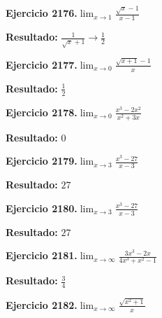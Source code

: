 \documentclass[10pt,a4paper]{article}
\begin{document}
\begin{ejbox}
\textbf{Ejercicio 2176.}\quad $\lim_{x\to 1} \frac{\sqrt{x}-1}{x-1}$
\end{ejbox}

\begin{solbox}
\textbf{Resultado:} \(\displaystyle \frac{1}{\sqrt{x}+1} \to \frac{1}{2}\)
\end{solbox}

\newpage
\begin{ejbox}
\textbf{Ejercicio 2177.}\quad $\lim_{x\to 0} \frac{\sqrt{x+1}-1}{x}$
\end{ejbox}

\begin{solbox}
\textbf{Resultado:} \(\displaystyle \frac{1}{2}\)
\end{solbox}

\begin{ejbox}
\textbf{Ejercicio 2178.}\quad $\lim_{x\to 0} \frac{x^3-2x^2}{x^2+3x}$
\end{ejbox}

\begin{solbox}
\textbf{Resultado:} \(\displaystyle 0\)
\end{solbox}

\begin{ejbox}
\textbf{Ejercicio 2179.}\quad $\lim_{x\to 3} \frac{x^3-27}{x-3}$
\end{ejbox}

\begin{solbox}
\textbf{Resultado:} \(\displaystyle 27\)
\end{solbox}

\newpage
\begin{ejbox}
\textbf{Ejercicio 2180.}\quad $\lim_{x\to 3} \frac{x^3-27}{x-3}$
\end{ejbox}

\begin{solbox}
\textbf{Resultado:} \(\displaystyle 27\)
\end{solbox}

\begin{ejbox}
\textbf{Ejercicio 2181.}\quad $\lim_{x\to \infty} \frac{3x^3 - 2x}{4x^3 + x^2 - 1}$
\end{ejbox}

\begin{solbox}
\textbf{Resultado:} \(\displaystyle \frac{3}{4}\)
\end{solbox}

\begin{ejbox}
\textbf{Ejercicio 2182.}\quad $\lim_{x\to \infty} \frac{\sqrt{x^2+1}}{x}$
\end{ejbox}
\end{document}
